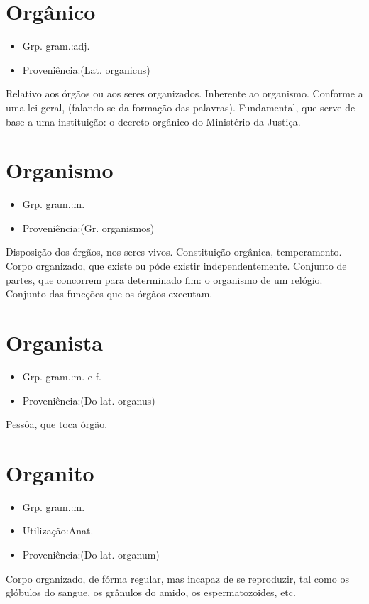 \section{Orgânico}
\begin{itemize}
\item {Grp. gram.:adj.}
\end{itemize}
\begin{itemize}
\item {Proveniência:(Lat. \textunderscore organicus\textunderscore )}
\end{itemize}
Relativo aos órgãos ou aos seres organizados.
Inherente ao organismo.
Conforme a uma lei geral, (falando-se da formação das palavras).
Fundamental, que serve de base a uma instituição: \textunderscore o decreto orgânico do Ministério da Justiça\textunderscore .
\section{Organismo}
\begin{itemize}
\item {Grp. gram.:m.}
\end{itemize}
\begin{itemize}
\item {Proveniência:(Gr. \textunderscore organismos\textunderscore )}
\end{itemize}
Disposição dos órgãos, nos seres vivos.
Constituição orgânica, temperamento.
Corpo organizado, que existe ou póde existir independentemente.
Conjunto de partes, que concorrem para determinado fim: \textunderscore o organismo de um relógio\textunderscore .
Conjunto das funcções que os órgãos executam.
\section{Organista}
\begin{itemize}
\item {Grp. gram.:m.  e  f.}
\end{itemize}
\begin{itemize}
\item {Proveniência:(Do lat. \textunderscore organus\textunderscore )}
\end{itemize}
Pessôa, que toca órgão.
\section{Organito}
\begin{itemize}
\item {Grp. gram.:m.}
\end{itemize}
\begin{itemize}
\item {Utilização:Anat.}
\end{itemize}
\begin{itemize}
\item {Proveniência:(Do lat. \textunderscore organum\textunderscore )}
\end{itemize}
Corpo organizado, de fórma regular, mas incapaz de se reproduzir, tal como os glóbulos do sangue, os grânulos do amido, os espermatozoides, etc.
